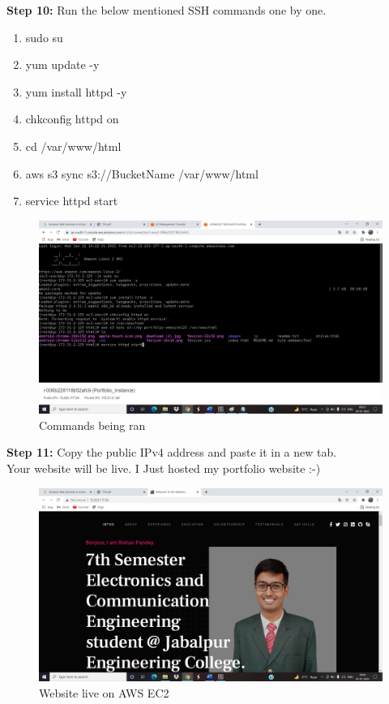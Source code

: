 \documentclass[12pt]{article}
\begin{document}
\textbf{Step 10:} Run the below mentioned SSH commands one by one.\\
\begin{enumerate}
\item sudo su
\item yum update -y
\item yum install httpd -y
\item chkconfig httpd on
\item cd /var/www/html
\item aws s3 sync s3://BucketName /var/www/html
\item service httpd start
\end{enumerate}
\clearpage

\begin{figure}[h]
\centering
\includegraphics[scale=0.265]{Untitled16.png}
\caption{Commands being ran}
\label{Commands being ran}
\end{figure}

\textbf{Step 11:} Copy the public IPv4 address and paste it in a new tab.\\

 Your website will be live. I Just hosted my portfolio website :-)

\begin{figure}[h]
\centering
\includegraphics[scale=0.265]{Untitled17.png}
\caption{Website live on AWS EC2}
\label{Website live on AWS EC2}
\end{figure}
\clearpage
\end{document}
